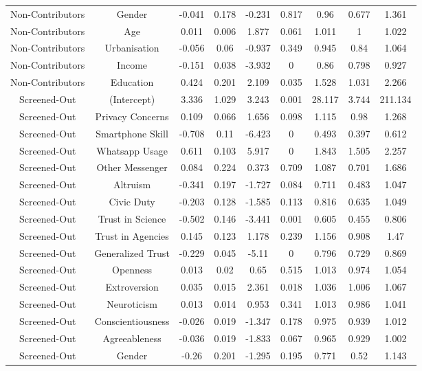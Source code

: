 \begin{table}[!htbp]
\begin{tabular}{@{\extracolsep{5pt}} ccccccccc}
Non-Contributors & Gender & -0.041 & 0.178 & -0.231 & 0.817 & 0.96 & 0.677 & 1.361 \\ 
Non-Contributors & Age & 0.011 & 0.006 & 1.877 & 0.061 & 1.011 & 1 & 1.022 \\ 
Non-Contributors & Urbanisation & -0.056 & 0.06 & -0.937 & 0.349 & 0.945 & 0.84 & 1.064 \\ 
Non-Contributors & Income & -0.151 & 0.038 & -3.932 & 0 & 0.86 & 0.798 & 0.927 \\ 
Non-Contributors & Education & 0.424 & 0.201 & 2.109 & 0.035 & 1.528 & 1.031 & 2.266 \\ 
Screened-Out & (Intercept) & 3.336 & 1.029 & 3.243 & 0.001 & 28.117 & 3.744 & 211.134 \\ 
Screened-Out & Privacy Concerns & 0.109 & 0.066 & 1.656 & 0.098 & 1.115 & 0.98 & 1.268 \\ 
Screened-Out & Smartphone Skill & -0.708 & 0.11 & -6.423 & 0 & 0.493 & 0.397 & 0.612 \\ 
Screened-Out & Whatsapp Usage & 0.611 & 0.103 & 5.917 & 0 & 1.843 & 1.505 & 2.257 \\ 
Screened-Out & Other Messenger & 0.084 & 0.224 & 0.373 & 0.709 & 1.087 & 0.701 & 1.686 \\ 
Screened-Out & Altruism & -0.341 & 0.197 & -1.727 & 0.084 & 0.711 & 0.483 & 1.047 \\ 
Screened-Out & Civic Duty & -0.203 & 0.128 & -1.585 & 0.113 & 0.816 & 0.635 & 1.049 \\ 
Screened-Out & Trust in Science & -0.502 & 0.146 & -3.441 & 0.001 & 0.605 & 0.455 & 0.806 \\ 
Screened-Out & Trust in Agencies & 0.145 & 0.123 & 1.178 & 0.239 & 1.156 & 0.908 & 1.47 \\ 
Screened-Out & Generalized Trust & -0.229 & 0.045 & -5.11 & 0 & 0.796 & 0.729 & 0.869 \\ 
Screened-Out & Openness & 0.013 & 0.02 & 0.65 & 0.515 & 1.013 & 0.974 & 1.054 \\ 
Screened-Out & Extroversion & 0.035 & 0.015 & 2.361 & 0.018 & 1.036 & 1.006 & 1.067 \\ 
Screened-Out & Neuroticism & 0.013 & 0.014 & 0.953 & 0.341 & 1.013 & 0.986 & 1.041 \\ 
Screened-Out & Conscientiousness & -0.026 & 0.019 & -1.347 & 0.178 & 0.975 & 0.939 & 1.012 \\ 
Screened-Out & Agreeableness & -0.036 & 0.019 & -1.833 & 0.067 & 0.965 & 0.929 & 1.002 \\ 
Screened-Out & Gender & -0.26 & 0.201 & -1.295 & 0.195 & 0.771 & 0.52 & 1.143 \\ 

\end{tabular}
\end{table}
